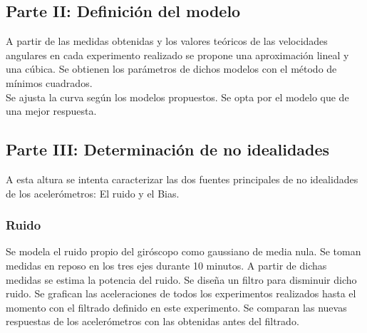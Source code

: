 \documentclass[spanish,12pt,a4paper,titlepage]{report}
\begin{document}
\subsection{Parte II: Definición del modelo}
A partir de las medidas obtenidas y los valores teóricos de las velocidades angulares en cada experimento realizado se propone una aproximación lineal y una cúbica. Se obtienen los parámetros de dichos modelos con el método de mínimos cuadrados.\\

Se ajusta la curva según los modelos propuestos. Se opta por el modelo que de una mejor respuesta.

\subsection{Parte III: Determinación de no idealidades}
A esta altura se intenta caracterizar las dos fuentes principales de no idealidades de los acelerómetros: El ruido y el Bias.

\subsubsection*{Ruido}
Se modela el ruido propio del giróscopo como gaussiano de media nula. Se toman medidas en reposo en los tres ejes durante 10 minutos. A partir de dichas medidas se estima la potencia del ruido. Se diseña un filtro para disminuir dicho ruido. Se grafican las aceleraciones de todos los experimentos realizados hasta el momento con el filtrado definido en este experimento. Se comparan las nuevas respuestas de los acelerómetros con las obtenidas antes del filtrado. 
\end{document}
